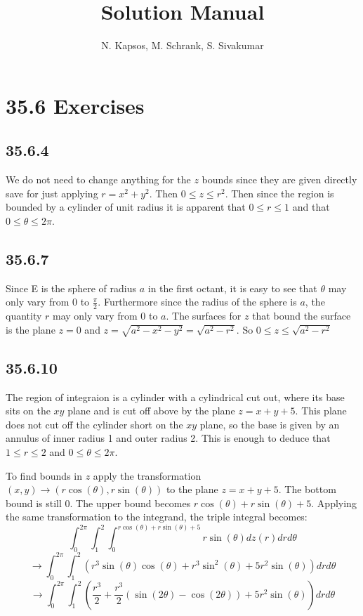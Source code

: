 \documentclass{article}
\title{Solution Manual}
\author{N. Kapsos, M. Schrank, S. Sivakumar}
\date{}
\begin{document}
\maketitle
\setcounter{secnumdepth}{0}

\section{35.6 Exercises}

\subsection{35.6.4}

We do not need to change anything for the $z$ bounds since they are given directly save for just applying $r = x^2+y^2$. Then $0\leq z \leq r^2$. Then since the region is bounded by a cylinder of unit radius it is apparent that $0\leq r \leq 1$ and that $0\leq \theta \leq 2\pi$.

\subsection{35.6.7}

Since E is the sphere of radius $a$ in the first octant, it is easy to see that $\theta$ may only vary from $0$ to $\frac{\pi}{2}$. Furthermore since the radius of the sphere is $a$, the quantity $r$ may only vary from $0$ to $a$. The surfaces for $z$ that bound the surface is the plane $z=0$ and $z=\sqrt{a^2-x^2-y^2}=\sqrt{a^2-r^2}$. So $0\leq z \leq \sqrt{a^2-r^2}$

\subsection{35.6.10}

The region of integraion is a cylinder with a cylindrical cut out, where its base sits on the $xy$ plane and is cut off above by the plane $z=x+y+5$. This plane does not cut off the cylinder short on the $xy$ plane, so the base is given by an annulus of inner radius 1 and outer radius 2. This is enough to deduce that $1\leq r \leq 2$ and $0\leq \theta \leq 2\pi$.

To find bounds in $z$ apply the transformation $(x,y) \to (r\cos(\theta),r\sin(\theta))$ to the plane $z = x+y+5$. The bottom bound is still $0$. The upper bound becomes $r\cos(\theta)+r\sin(\theta)+5$. Applying the same transformation to the integrand, the triple integral becomes: $$\int_{0}^{2\pi}\int_{1}^{2}\int_{0}^{r\cos(\theta)+r\sin(\theta)+5}r\sin(\theta)dz(r)drd\theta $$
$$\to \int_{0}^{2\pi}\int_{1}^{2} \left(r^3\sin(\theta)\cos(\theta) + r^3\sin^2(\theta) + 5r^2\sin(\theta)\right) drd\theta$$
$$\to \int_{0}^{2\pi}\int_{1}^{2} \left(\frac{r^3}{2} + \frac{r^3}{2}\left(\sin(2\theta) - \cos(2\theta)\right) + 5r^2\sin(\theta)\right) drd\theta$$
\end{document}
